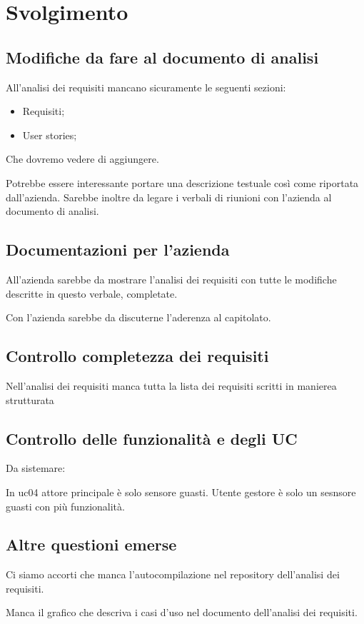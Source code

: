 \section{Svolgimento}

\subsection{Modifiche da fare al documento di analisi}

All'analisi dei requisiti mancano sicuramente le seguenti sezioni:
\begin{itemize}
    \item Requisiti;
    \item User stories;
\end{itemize}
Che dovremo vedere di aggiungere.

Potrebbe essere interessante portare una descrizione testuale così come riportata dall'azienda. Sarebbe inoltre da legare i verbali di riunioni con l'azienda al documento di analisi.

\subsection{Documentazioni per l'azienda}

All'azienda sarebbe da mostrare l'analisi dei requisiti con tutte le modifiche descritte in questo verbale, completate.

Con l'azienda sarebbe da discuterne l'aderenza al capitolato.

\subsection{Controllo completezza dei requisiti}

Nell'analisi dei requisiti manca tutta la lista dei requisiti scritti in manierea strutturata

\subsection{Controllo delle funzionalità e degli UC}

Da sistemare: 

In uc04 attore principale è solo sensore guasti. Utente gestore è solo un sesnsore guasti con più funzionalità.


\subsection{Altre questioni emerse}

Ci siamo accorti che manca l'autocompilazione nel repository dell'analisi dei requisiti.

Manca il grafico che descriva i casi d'uso nel documento dell'analisi dei requisiti.
